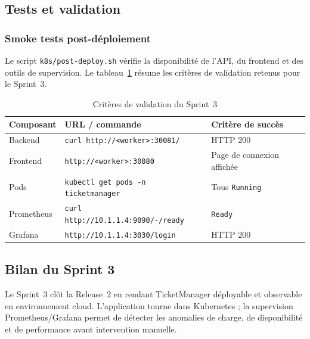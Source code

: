 \subsection{Tests et validation}

\subsubsection{Smoke tests post-déploiement}

Le script \texttt{k8s/post-deploy.sh} vérifie la disponibilité de l'API, du frontend et
des outils de supervision. Le tableau~\ref{tab:r2-s3-validation} résume les critères de
validation retenus pour le Sprint~3.

\begin{table}[H]
\centering
\caption{Critères de validation du Sprint~3}
\label{tab:r2-s3-validation}
\footnotesize
\renewcommand{\arraystretch}{1.1}
\setlength{\tabcolsep}{6pt}
\begin{tabular}{|l|l|l|}
\hline
\textbf{Composant} & \textbf{URL / commande} & \textbf{Critère de succès} \\
\hline
Backend & \texttt{curl http://<worker>:30081/} & HTTP 200 \\
\hline
Frontend & \texttt{http://<worker>:30080} & Page de connexion affichée \\
\hline
Pods & \texttt{kubectl get pods -n ticketmanager} & Tous \texttt{Running} \\
\hline
Prometheus & \texttt{curl http://10.1.1.4:9090/-/ready} & \texttt{Ready} \\
\hline
Grafana & \texttt{http://10.1.1.4:3030/login} & HTTP 200 \\
\hline
\end{tabular}
\end{table}


\subsection{Bilan du Sprint 3}

Le Sprint~3 clôt la Release~2 en rendant TicketManager déployable et observable en
environnement cloud. L'application tourne dans Kubernetes ; la supervision Prometheus/Grafana
permet de détecter les anomalies de charge, de disponibilité et de performance avant
intervention manuelle.
